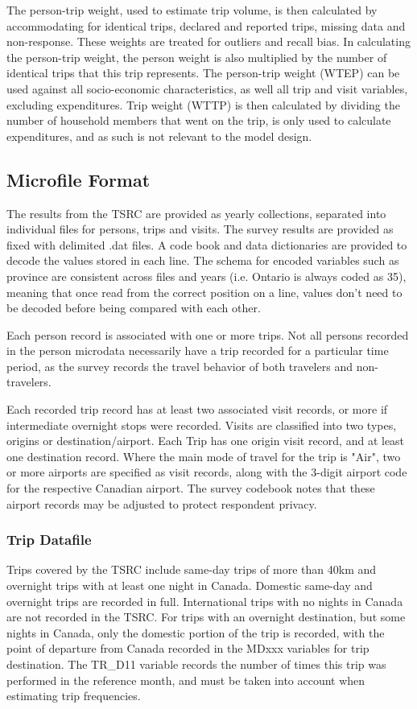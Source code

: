 The person-trip weight, used to estimate trip volume, is then calculated by accommodating for identical trips, declared and reported trips, missing data and non-response. These weights are treated for outliers and recall bias. In calculating the person-trip weight, the person weight is also multiplied by the number of identical trips that this trip represents. The person-trip weight (WTEP) can be used against all socio-economic characteristics, as well all trip and visit variables, excluding expenditures. Trip weight (WTTP) is then calculated by dividing the number of household members that went on the trip, is only used to calculate expenditures, and as such is not relevant to the model design. 

\subsection{Microfile Format}
The results from the TSRC are provided as yearly collections, separated into individual files for persons, trips and visits. The survey results are provided as fixed with delimited .dat files. A code book and data dictionaries are provided to decode the values stored in each line. The schema for encoded variables such as province are consistent across files and years (i.e. Ontario is always coded as 35), meaning that once read from the correct position on a line, values don't need to be decoded before being compared with each other. 

Each person record is associated with one or more trips. Not all persons recorded in the person microdata necessarily have a trip recorded for a particular time period, as the survey records the travel behavior of both travelers and non-travelers.

Each recorded trip record has at least two associated visit records, or more if intermediate overnight stops were recorded. Visits are classified into two types, origins or destination/airport. Each Trip has one origin visit record, and at least one destination record. Where the main mode of travel for the trip is "Air", two or more airports are specified as visit records, along with the 3-digit airport code for the respective Canadian airport. The survey codebook notes that these airport records may be adjusted to protect respondent privacy.

\subsubsection{Trip Datafile}
Trips covered by the TSRC include same-day trips of more than 40km and overnight trips with at least one night in Canada. Domestic same-day and overnight trips are recorded in full. International trips with no nights in Canada are not recorded in the TSRC. For trips with an overnight destination, but some nights in Canada, only the domestic portion of the trip is recorded, with the point of departure from Canada recorded in the MDxxx variables for trip destination. The TR\_D11 variable records the number of times this trip was performed in the reference month, and must be taken into account when estimating trip frequencies.

